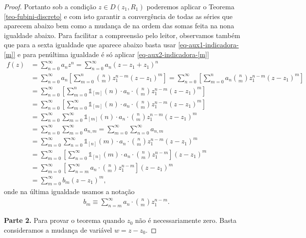 \begin{proof}
\bigskip 
Portanto sob a condição $z\in D(z_1,R_{1})$ poderemos aplicar o Teorema \ref{teo-fubini-discreto} e com isto garantir
a convergência de todas as séries que aparecem abaixo bem como a mudança de 
na ordem das somas feita na nona igualdade abaixo. 
Para facilitar a compreensão pelo leitor, 
observamos também que para a sexta igualdade
que aparece abaixo basta usar \eqref{eq-aux1-indicadora-[m]} e para penúltima
igualdade é só aplicar \eqref{eq-aux2-indicadora-[m]}
\begin{align*}
f(z)
&=
\sum_{n=0}^{\infty} a_nz^n
=
\sum_{n=0}^{\infty} a_n(z-z_1+z_1)^n
\\[0.3cm]
&=
\sum_{n=0}^{\infty} a_n \left[ \sum_{m=0}^n \binom{n}{m}z_1^{n-m}(z-z_1)^m  \right]
=
\sum_{n=0}^{\infty}  \left[ \sum_{m=0}^n a_n\binom{n}{m}z_1^{n-m}(z-z_1)^m  \right]
\\[0.3cm]
&=
\sum_{n=0}^{\infty}  \left[ \sum_{m=0}^n 
\mathds{1}_{[m]}(n)\cdot a_n\cdot \binom{n}{m}z_1^{n-m}(z-z_1)^m  \right]
\\[0.3cm]
&=
\sum_{n=0}^{\infty}  \left[ \sum_{m=0}^{\infty} 
\mathds{1}_{[m]}(n)\cdot a_n\cdot \binom{n}{m}z_1^{n-m}(z-z_1)^m  \right]
\\[0.3cm]
&=
\sum_{n=0}^{\infty}  
\sum_{m=0}^{\infty} 
\mathds{1}_{[m]}(n)\cdot a_n\cdot \binom{n}{m}z_1^{n-m}(z-z_1)^m  
\\[0.3cm]
&=
\sum_{n=0}^{\infty}  
\sum_{m=0}^{\infty} 
a_{n,m}
=
\sum_{m=0}^{\infty} 
\sum_{n=0}^{\infty}  
a_{n,m}
\\[0.3cm]
&=
\sum_{m=0}^{\infty} \sum_{n=0}^{\infty} 
\mathds{1}_{[n]}(m)\cdot a_n\cdot \binom{n}{m}z_1^{n-m}
(z-z_1)^m
\\[0.3cm]
&=
\sum_{m=0}^{\infty}  \left[ \sum_{n=0}^{\infty} 
\mathds{1}_{[n]}(m)\cdot a_n\cdot \binom{n}{m}z_1^{n-m}  \right]
(z-z_1)^m
\\[0.3cm]
&=
\sum_{m=0}^{\infty}  
\left[ 
\sum_{n=m}^{\infty}  a_n\cdot \binom{n}{m}z_1^{n-m}  \right]
(z-z_1)^m
\\[0.3cm]
&=
\sum_{m=0}^{\infty} b_m(z-z_1)^m,
\end{align*}
onde na última igualdade usamos a notação
\begin{align}\label{eq-aux1-teo-series-pot-analiticas}
b_m \equiv \sum_{n=m}^{\infty}  a_n\cdot \binom{n}{m}z_1^{n-m}.
\end{align}

\bigskip 

\noindent\textbf {Parte 2.}
Para provar o teorema quando $z_0$ não é necessariamente zero.
Basta consideramos a mudança de variável $w=z-z_0$.


\end{proof}

